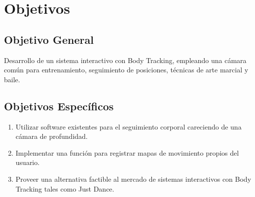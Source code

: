 \chapter{Objetivos}


\section{Objetivo General}

Desarrollo de un sistema interactivo con Body Tracking, empleando una cámara común para entrenamiento,  seguimiento de posiciones, técnicas de arte marcial y baile.
\section{Objetivos Específicos}

\begin{enumerate}
	\item Utilizar software existentes para el seguimiento corporal careciendo de una cámara de profundidad.
	\item Implementar una función para registrar mapas de movimiento propios del usuario.
	\item Proveer una alternativa factible al mercado de sistemas interactivos con Body Tracking tales como Just Dance.
\end{enumerate}

